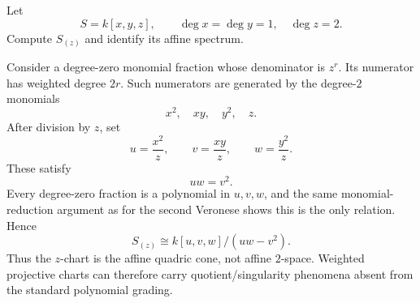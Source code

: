 \begin{problem}\label{prob:vi34-17}
Let
\[
S=k[x,y,z],\qquad \deg x=\deg y=1,\quad \deg z=2.
\]
Compute \(S_{(z)}\) and identify its affine spectrum.

\end{problem}

\ifdefined\FullProblemDossiers
\begin{solution}
Consider a degree-zero monomial fraction whose denominator is \(z^r\). Its numerator has weighted degree
\(2r\). Such numerators are generated by the degree-\(2\) monomials
\[
x^2,\quad xy,\quad y^2,\quad z.
\]
After division by \(z\), set
\[
u=\frac{x^2}{z},\qquad
v=\frac{xy}{z},\qquad
w=\frac{y^2}{z}.
\]
These satisfy
\[
uw=v^2.
\]
Every degree-zero fraction is a polynomial in \(u,v,w\), and the same monomial-reduction argument as for the second
Veronese shows this is the only relation. Hence
\[
\boxed{
S_{(z)}
\cong
k[u,v,w]/(uw-v^2).
}
\]
Thus the \(z\)-chart is the affine quadric cone, not affine \(2\)-space. Weighted projective charts can therefore
carry quotient/singularity phenomena absent from the standard polynomial grading.
\end{solution}
\fi
